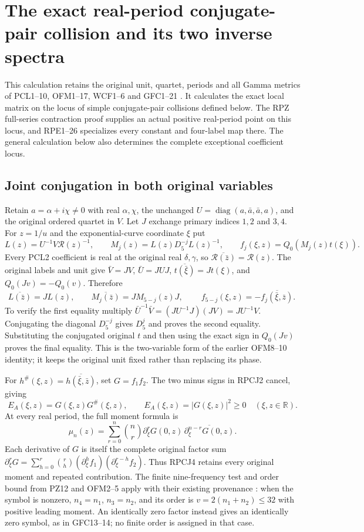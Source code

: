 \section{The exact real-period conjugate-pair collision and its two inverse spectra}
This calculation retains the original unit, quartet, periods and all
Gamma metrics of PCL1--10, OFM1--17, WCF1--6 and GFC1--21
\cite{PCLOriginal,NC,Cumulative,WCF}. It calculates the exact local
matrix on the locus of simple conjugate-pair collisions defined below.
The RPZ full-series contraction proof supplies an actual positive
real-period point on this locus, and RPE1--26 specializes every
constant and four-label map there. The general calculation below
also determines the complete exceptional coefficient locus.

\subsection{Joint conjugation in both original variables}
Retain $a=\alpha+i\chi\ne0$ with real $\alpha,\chi$, the unchanged
$U=\operatorname{diag}(a,\bar a,\bar a,a)$, and the original
ordered quartet in $V$. Let $J$ exchange primary indices $1,2$ and
$3,4$. For $z=1/u$ and the exponential-curve coordinate $\xi$ put
\[
 L(z)=U^{-1}V\mathcal R(z)^{-1},\qquad
 M_j(z)=L(z)D_5^{-j}L(z)^{-1},\qquad
 f_j(\xi,z)=Q_0(M_j(z)t(\xi)).
 \tag{RPCJ1}
\]
Every PCL2 coefficient is real at the original real $\delta,\gamma$,
so $\overline{\mathcal R(\bar z)}=\mathcal R(z)$.
The original labels and unit give
$\bar V=JV$, $\bar U=JUJ$, $\overline{t(\bar\xi)}=Jt(\xi)$,
and $Q_0(Jv)=-Q_0(v)$. Therefore
\[
 \overline{L(\bar z)}=JL(z),\qquad
 \overline{M_j(\bar z)}=JM_{5-j}(z)J,
 \qquad
 \boxed{\ f_{5-j}(\xi,z)=-\overline{f_j(\bar\xi,\bar z)}.\ }
 \tag{RPCJ2}
\]
To verify the first equality multiply
$\bar U^{-1}\bar V=(JU^{-1}J)(JV)=JU^{-1}V$.
Conjugating the diagonal $D_5^{-j}$ gives $D_5^j$ and proves the
second equality. Substituting the conjugated original $t$ and then
using the exact sign in $Q_0(Jv)$ proves the final equality.
This is the two-variable form of the earlier OFM8--10 identity;
it keeps the original unit fixed rather than replacing its phase.

For $h^\#(\xi,z)=\overline{h(\bar\xi,\bar z)}$, set
$G=f_1f_2$. The two minus signs in RPCJ2 cancel, giving
\[
 E_A(\xi,z)=G(\xi,z)G^\#(\xi,z),\qquad
 E_A(\xi,z)=|G(\xi,z)|^2\ge0
                 \quad(\xi,z\in\mathbb R).
 \tag{RPCJ3}
\]
At every real period, the full moment formula is
\[
 \mu_n(z)=\sum_{r=0}^n\binom nr
        \partial_\xi^rG(0,z)\,
                  \overline{\partial_\xi^{n-r}G(0,z)}.
 \tag{RPCJ4}
\]
Each derivative of $G$ is itself the complete original factor sum
$\partial_\xi^rG=\sum_{h=0}^r\binom rh
(\partial_\xi^hf_1)(\partial_\xi^{r-h}f_2)$.
Thus RPCJ4 retains every original moment and repeated contribution.
The finite nine-frequency test and order bound from PZ12 and OFM2--5
apply with their existing provenance
\cite{PeriodZeroOriginal,Cumulative}: when the symbol is nonzero,
$n_4=n_1$, $n_3=n_2$, and its order is
$v=2(n_1+n_2)\le32$ with positive leading moment.
An identically zero factor instead gives an identically zero symbol,
as in GFC13--14; no finite order is assigned in that case.

